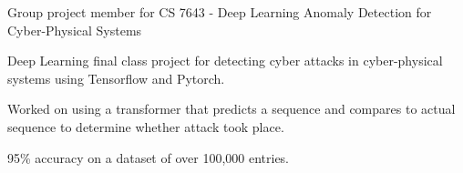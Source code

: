 
\begin{cventries}

    \cventry
        {Group project member for CS 7643 - Deep Learning} %
        {Anomaly Detection for Cyber-Physical Systems} %
        {\;} %
        {} %
        {
          \begin{cvitems} %
          	\item {Deep Learning final class project for detecting cyber attacks in cyber-physical systems using Tensorflow and Pytorch.}
    		\item {Worked on using a transformer that predicts a sequence and compares to actual sequence to determine whether attack took place.}
    		\item {95\% accuracy on a dataset of over 100,000 entries.}
          \end{cvitems}
        }

\end{cventries}